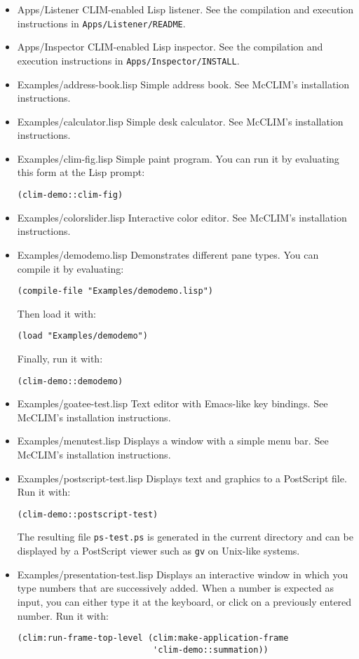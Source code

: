 \begin{itemize}
\item Apps/Listener
CLIM-enabled Lisp listener.  See the compilation and execution
instructions in \texttt{Apps/Listener/README}.
\item Apps/Inspector
CLIM-enabled Lisp inspector.  See the compilation and execution
instructions in \texttt{Apps/Inspector/INSTALL}.
\item Examples/address-book.lisp
Simple address book.  See McCLIM's installation instructions.
\item Examples/calculator.lisp
Simple desk calculator.  See McCLIM's installation instructions.
\item Examples/clim-fig.lisp
Simple paint program.  You can run it by evaluating this form at the
Lisp prompt:
\begin{verbatim}
(clim-demo::clim-fig)
\end{verbatim}
\item Examples/colorslider.lisp
Interactive color editor.  See McCLIM's installation instructions.
\item Examples/demodemo.lisp
Demonstrates different pane types.  You can compile it by evaluating:
\begin{verbatim}
(compile-file "Examples/demodemo.lisp")
\end{verbatim}
Then load it with:
\begin{verbatim}
(load "Examples/demodemo")
\end{verbatim}
Finally, run it with:
\begin{verbatim}
(clim-demo::demodemo)
\end{verbatim}
\item Examples/goatee-test.lisp
Text editor with Emacs-like key bindings.  See McCLIM's installation
instructions.
\item Examples/menutest.lisp
Displays a window with a simple menu bar.  See McCLIM's installation
instructions.
\item Examples/postscript-test.lisp
Displays text and graphics to a PostScript file.  Run it with:
\begin{verbatim}
(clim-demo::postscript-test)
\end{verbatim}
The resulting file \texttt{ps-test.ps} is generated in the current directory
and can be displayed by a PostScript viewer such as \texttt{gv} on Unix-like
systems.
\item Examples/presentation-test.lisp
Displays an interactive window in which you type numbers that are
successively added.  When a number is expected as input, you can either
type it at the keyboard, or click on a previously entered number. Run it
with:
\begin{verbatim}
(clim:run-frame-top-level (clim:make-application-frame
                           'clim-demo::summation))
\end{verbatim}


\end{itemize}
